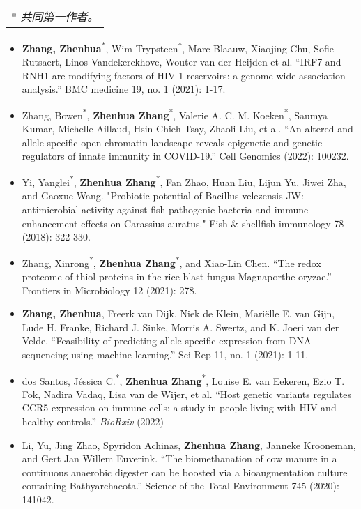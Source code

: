 \documentclass[8pt,A4]{article}
\newcommand{\mpwidth}{\linewidth-\fboxsep-\fboxsep}
\newcommand{\cvtextsmall}[1] {
	\begin{tabular*}{0.8\mpwidth}{p{0.8\mpwidth}}
		\parbox{0.8\mpwidth}{#1}
	\end{tabular*}
}
\begin{document}
\begin{paracol}{2}
\begin{rightcolumn}
\cvtextsmall{* \textit{共同第一作者。}}
\begin{itemize}[leftmargin=2em,itemsep=-2pt]
  \item \textbf{Zhang, Zhenhua}\textsuperscript{*}, Wim Trypsteen\textsuperscript{*}, Marc Blaauw, Xiaojing Chu, Sofie Rutsaert, Linos Vandekerckhove, Wouter van der Heijden et al. \enquote{IRF7 and RNH1 are modifying factors of HIV-1 reservoirs: a genome-wide association analysis.} BMC medicine 19, no. 1 (2021): 1-17.
  \item Zhang, Bowen\textsuperscript{*}, \textbf{Zhenhua Zhang}\textsuperscript{*}, Valerie A. C. M. Koeken\textsuperscript{*}, Saumya Kumar, Michelle Aillaud, Hsin-Chieh Tsay, Zhaoli Liu, et al. \enquote{An altered and allele-specific open chromatin landscape reveals epigenetic and genetic regulators of innate immunity in COVID-19.} Cell Genomics (2022): 100232.
  \item Yi, Yanglei\textsuperscript{*}, \textbf{Zhenhua Zhang}\textsuperscript{*}, Fan Zhao, Huan Liu, Lijun Yu, Jiwei Zha, and Gaoxue Wang. "Probiotic potential of Bacillus velezensis JW: antimicrobial activity against fish pathogenic bacteria and immune enhancement effects on Carassius auratus." Fish \& shellfish immunology 78 (2018): 322-330.
  \item Zhang, Xinrong\textsuperscript{*}, \textbf{Zhenhua Zhang}\textsuperscript{*}, and Xiao-Lin Chen. \enquote{The redox proteome of thiol proteins in the rice blast fungus Magnaporthe oryzae.} Frontiers in Microbiology 12 (2021): 278.
  \item \textbf{Zhang, Zhenhua}, Freerk van Dijk, Niek de Klein, Mariëlle E. van Gijn, Lude H. Franke, Richard J. Sinke, Morris A. Swertz, and K. Joeri van der Velde. \enquote{Feasibility of predicting allele specific expression from DNA sequencing using machine learning.} Sci Rep 11, no. 1 (2021): 1-11.
  \item dos Santos, Jéssica C.\textsuperscript{*}, \textbf{Zhenhua Zhang}\textsuperscript{*}, Louise E. van Eekeren, Ezio T. Fok, Nadira Vadaq, Lisa van de Wijer, et al. \enquote{Host genetic variants regulates CCR5 expression on immune cells: a study in people living with HIV and healthy controls.} \textit{BioRxiv} (2022)
  \item Li, Yu, Jing Zhao, Spyridon Achinas, \textbf{Zhenhua Zhang}, Janneke Krooneman, and Gert Jan Willem Euverink. \enquote{The biomethanation of cow manure in a continuous anaerobic digester can be boosted via a bioaugmentation culture containing Bathyarchaeota.} Science of the Total Environment 745 (2020): 141042.

\end{itemize}
\end{rightcolumn}
\end{paracol}
\end{document}
